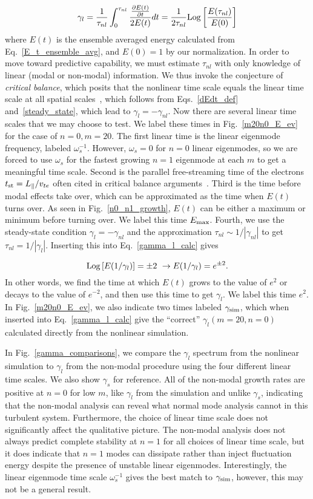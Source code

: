 \documentclass[letter,scriptaddress,twocolumn, prl,showkeys]{revtex4}
\def\beq{\begin{equation}}
\def\eeq{\end{equation}}
\def\para{\parallel}
\newcommand{\pdiff}[2]{\frac{\partial#1}{\partial#2}}
\begin{document}
\beq
\label{gamma_l_calc}
\gamma_l = \frac{1}{\tau_{nl}} \int_0^{\tau_{nl}} \frac{\pdiff{E(t)}{t}}{2 E(t)} dt = \frac{1}{2 \tau_{nl}} {\rm{Log}} \left[ \frac{E(\tau_{nl})}{E(0)}\right]
\eeq
where $E(t)$ is the ensemble averaged energy calculated from Eq.~\ref{E_t_ensemble_avg}, and $E(0) = 1$ by our normalization.
In order to move toward predictive capability, we must estimate $\tau_{nl}$ with only knowledge of linear (modal or non-modal) information. 
We thus invoke the conjecture of \emph{critical balance}, which posits that the nonlinear time scale equals the linear time scale at all spatial scales~\cite{schekochihin2012}, which follows from 
Eqs.~\ref{dEdt_def} and~\ref{steady_state}, which lead to $\gamma_l = - \gamma_{nl}$. Now there are several linear time scales that we may choose to test. We label these times in Fig.~\ref{m20n0_E_ev}
for the case of $n=0, m=20$. The first linear time is the linear eigenmode frequency, labeled
$\omega_s^{-1}$. However, $\omega_s = 0$ for $n=0$ linear eigenmodes, so we are forced to use $\omega_s$ for the fastest growing $n=1$ eigenmode at each $m$ to get a meaningful time scale.
Second is the parallel free-streaming time of the electrons $t_{\rm{st}} = L_\para/v_{t e}$ often cited in critical balance arguments~\cite{barnes2011}. Third is the time before modal effects
take over, which can be approximated as the time when $E(t)$ turns over. As seen in Fig.~\ref{n0_n1_growth}, $E(t)$ can be either a maximum or minimum before turning over. We label this time $E_{\rm{max}}$. 
Fourth, we use the steady-state condition $\gamma_l = - \gamma_{nl}$ and the approximation $\tau_{nl} \sim 1/|\gamma_{nl}|$ to get $\tau_{nl} = 1/|\gamma_l|$. Inserting this into Eq.~\ref{gamma_l_calc} gives

\beq
\label{fourth_gamma_cond}
 {\rm{Log}} \left[ E(1/\gamma_l)\right] = \pm 2 \ \rightarrow E(1/\gamma_l) = e^{\pm 2}.
\eeq
In other words, we find the time at which $E(t)$ grows to the value of $e^2$ or decays to the value of $e^{-2}$, and then use this time to get $\gamma_l$. We label this time $e^2$. In Fig.~\ref{m20n0_E_ev},
we also indicate two times labeled $\gamma_{\rm{sim}}$, which when inserted into Eq.~\ref{gamma_l_calc} give the ``correct'' $\gamma_l(m=20,n=0)$ calculated directly from the nonlinear simulation.

In Fig.~\ref{gamma_comparisons}, we compare the $\gamma_{l}$ spectrum from the nonlinear simulation to $\gamma_l$ from the non-modal procedure using the four different linear time scales. We also show
$\gamma_s$ for reference. All of the non-modal growth rates are positive at $n=0$ for low $m$, like $\gamma_l$ from the simulation and unlike $\gamma_s$, indicating that the non-modal analysis can reveal
what normal mode analysis cannot in this turbulent system. Furthermore, the choice of linear time scale does not significantly affect the qualitative picture. The non-modal analysis does not always
predict complete stability at $n=1$ for all choices of linear time scale, but it does indicate that $n=1$ modes can dissipate rather than inject fluctuation energy despite the presence of unstable
linear eigenmodes. Interestingly, the linear eigenmode time scale $\omega_s^{-1}$ gives the best match to $\gamma_{\rm{sim}}$, however, this may not be a general result.
\end{document}
